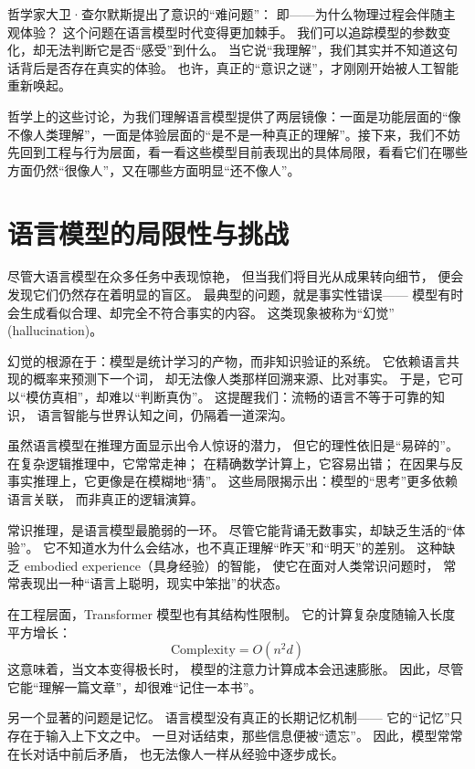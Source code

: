 哲学家大卫·查尔默斯提出了意识的“难问题”：  
即——为什么物理过程会伴随主观体验？  
这个问题在语言模型时代变得更加棘手。  
我们可以追踪模型的参数变化，却无法判断它是否“感受”到什么。  
当它说“我理解”，我们其实并不知道这句话背后是否存在真实的体验。  
也许，真正的“意识之谜”，才刚刚开始被人工智能重新唤起。  

哲学上的这些讨论，为我们理解语言模型提供了两层镜像：一面是功能层面的“像不像人类理解”，一面是体验层面的“是不是一种真正的理解”。接下来，我们不妨先回到工程与行为层面，看一看这些模型目前表现出的具体局限，看看它们在哪些方面仍然“很像人”，又在哪些方面明显“还不像人”。

\section{语言模型的局限性与挑战}

尽管大语言模型在众多任务中表现惊艳，  
但当我们将目光从成果转向细节，  
便会发现它们仍然存在着明显的盲区。  
最典型的问题，就是事实性错误——  
模型有时会生成看似合理、却完全不符合事实的内容。  
这类现象被称为“幻觉” (hallucination)。  

幻觉的根源在于：模型是统计学习的产物，而非知识验证的系统。  
它依赖语言共现的概率来预测下一个词，  
却无法像人类那样回溯来源、比对事实。  
于是，它可以“模仿真相”，却难以“判断真伪”。  
这提醒我们：流畅的语言不等于可靠的知识，  
语言智能与世界认知之间，仍隔着一道深沟。  

虽然语言模型在推理方面显示出令人惊讶的潜力，  
但它的理性依旧是“易碎的”。  
在复杂逻辑推理中，它常常走神；  
在精确数学计算上，它容易出错；  
在因果与反事实推理上，它更像是在模糊地“猜”。  
这些局限揭示出：模型的“思考”更多依赖语言关联，  
而非真正的逻辑演算。  

常识推理，是语言模型最脆弱的一环。  
尽管它能背诵无数事实，却缺乏生活的“体验”。  
它不知道水为什么会结冰，也不真正理解“昨天”和“明天”的差别。  
这种缺乏 embodied experience（具身经验）的智能，  
使它在面对人类常识问题时，  
常常表现出一种“语言上聪明，现实中笨拙”的状态。  

在工程层面，Transformer 模型也有其结构性限制。  
它的计算复杂度随输入长度平方增长：  
\[
\text{Complexity} = O(n^2 d)
\]  
这意味着，当文本变得极长时，  
模型的注意力计算成本会迅速膨胀。  
因此，尽管它能“理解一篇文章”，却很难“记住一本书”。  

另一个显著的问题是记忆。  
语言模型没有真正的长期记忆机制——  
它的“记忆”只存在于输入上下文之中。  
一旦对话结束，那些信息便被“遗忘”。  
因此，模型常常在长对话中前后矛盾，  
也无法像人一样从经验中逐步成长。  

